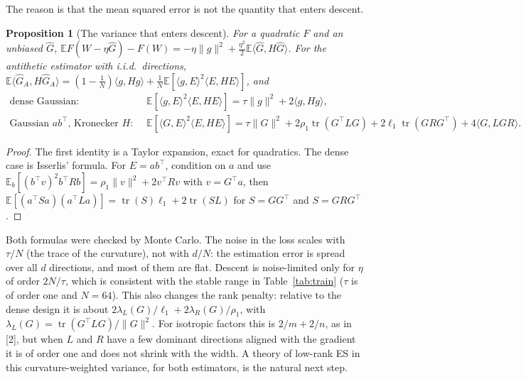 \documentclass[11pt]{article}
\newtheorem{proposition}[theorem]{Proposition}
\theoremstyle{remark}
\newcommand{\E}{\mathbb{E}}
\newcommand{\ip}[2]{\langle #1,#2\rangle}
\DeclareMathOperator{\tr}{tr}
\newcommand{\Gh}{\widehat G}
\begin{document}
The reason is that the mean squared error is not the quantity that enters descent.
\begin{proposition}[The variance that enters descent]\label{prop:hweighted}
For a quadratic $F$ and an unbiased $\Gh$, $\E F(W-\eta\Gh)-F(W)=-\eta\|g\|^2+\frac{\eta^2}2\E\ip{\Gh}{H\Gh}$. For the antithetic estimator with i.i.d.\ directions, $\E\ip{\Gh_A}{H\Gh_A}=(1-\frac1N)\ip{g}{Hg}+\frac1N\E[\ip{g}{E}^2\ip{E}{HE}]$, and
\begin{align*}
\text{dense Gaussian:}\quad&\E[\ip{g}{E}^2\ip{E}{HE}]=\tau\|g\|^2+2\ip{g}{Hg},\\
\text{Gaussian }ab^\top\text{, Kronecker }H:\quad&\E[\ip{G}{E}^2\ip{E}{HE}]=\tau\|G\|^2+2\rho_1\tr(G^\top LG)+2\ell_1\tr(GRG^\top)+4\ip{G}{LGR}.
\end{align*}
\end{proposition}
\begin{proof}
The first identity is a Taylor expansion, exact for quadratics. The dense case is Isserlis' formula. For $E=ab^\top$, condition on $a$ and use $\E_b[(b^\top v)^2b^\top Rb]=\rho_1\|v\|^2+2v^\top Rv$ with $v=G^\top a$, then $\E[(a^\top Sa)(a^\top La)]=\tr(S)\ell_1+2\tr(SL)$ for $S=GG^\top$ and $S=GRG^\top$.
\end{proof}
Both formulas were checked by Monte Carlo. The noise in the loss scales with $\tau/N$ (the trace of the curvature), not with $d/N$: the estimation error is spread over all $d$ directions, and most of them are flat. Descent is noise-limited only for $\eta$ of order $2N/\tau$, which is consistent with the stable range in Table~\ref{tab:train} ($\tau$ is of order one and $N=64$). This also changes the rank penalty: relative to the dense design it is about $2\lambda_L(G)/\ell_1+2\lambda_R(G)/\rho_1$, with $\lambda_L(G)=\tr(G^\top LG)/\|G\|^2$. For isotropic factors this is $2/m+2/n$, as in [2], but when $L$ and $R$ have a few dominant directions aligned with the gradient it is of order one and does not shrink with the width. A theory of low-rank ES in this curvature-weighted variance, for both estimators, is the natural next step.
\end{document}
